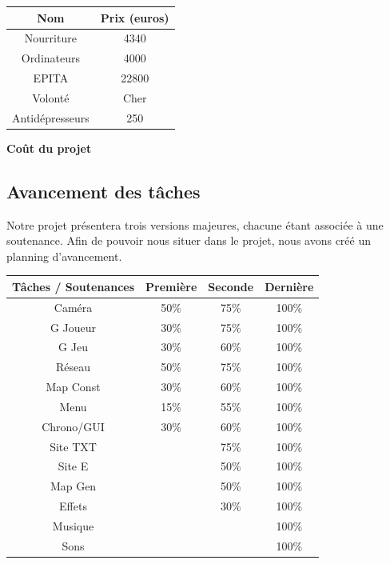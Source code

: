 \documentclass{article}
\begin{document}
\begin{center}
\begin{tabular}{|c|c|}
	\hline
	Nom & Prix (euros) \\
	\hline
	Nourriture & 4340 \\
	\hline
	Ordinateurs & 4000 \\
	\hline
	EPITA & 22800 \\
	\hline
	Volonté & Cher \\
	\hline
	Antidépresseurs & 250 \\
	\hline	
\end{tabular}
\end{center}

\begin{center}
	\bf{Coût du projet}
\end{center}

\newpage
\subsection{Avancement des tâches}

Notre projet présentera trois versions majeures, chacune étant associée à une soutenance.
Afin de pouvoir nous situer dans le projet, nous avons créé un planning d'avancement.

\begin{center}
\begin{tabular}{|c|c|c|c|}
	\hline
	Tâches / Soutenances & Première & Seconde & Dernière \\
	\hline
	Caméra & 50\% & 75\% & 100\% \\
	\hline
	G Joueur & 30\% & 75\% & 100\% \\
	\hline
	G Jeu & 30\% & 60\% & 100\% \\
	\hline
	Réseau & 50\% & 75\% & 100\% \\
	\hline
	Map Const & 30\% & 60\% & 100\% \\
	\hline
	Menu & 15\% & 55\% & 100\%\\
	\hline
	Chrono/GUI & 30\% & 60\% & 100\% \\
	\hline
	Site TXT & & 75\% & 100\% \\
	\hline
	Site E &  & 50\% & 100\% \\
	\hline
	Map Gen & & 50\% & 100\% \\
	\hline
	Effets & & 30\% & 100\% \\
	\hline
	Musique & & & 100\%  \\
	\hline
	Sons & & & 100\% \\
	\hline	
\end{tabular}
\end{center}
\end{document}
